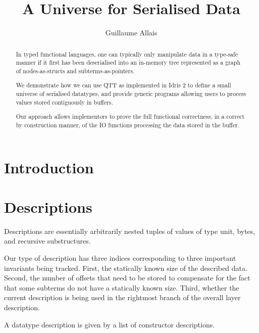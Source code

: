 \documentclass{article}
\title{A Universe for Serialised Data}
\author{Guillaume Allais}
\begin{document}
\maketitle

\begin{abstract}
In typed functional languages, one can typically only manipulate data
in a type-safe manner if it first has been deserialised into an in-memory
tree represented as a graph of nodes-as-structs and subterms-as-pointers.

We demonstrate how we can use QTT as implemented in Idris 2 to define
a small universe of serialised datatypes, and provide generic programs
allowing users to process values stored contiguously in buffers.

Our approach allows implementors to prove the full functional correctness,
in a correct by construction manner, of the IO functions processing the
data stored in the buffer.
\end{abstract}

\section{Introduction}

\section{Descriptions}

Descriptions are essentially arbitrarily nested tuples of
values of type unit,
bytes,
and recursive substructures.

Our type of description has three indices corresponding to three important
invariants being tracked.
%
First, the statically known size of the described data.
%
Second, the number of offsets that need to be stored to compensate for the
fact that some subterms do not have a statically known size.
%
Third, whether the current description is being used in the rightmost branch
of the overall layer description.




A datatype description is given by a list of constructor descriptions.



\end{document}
